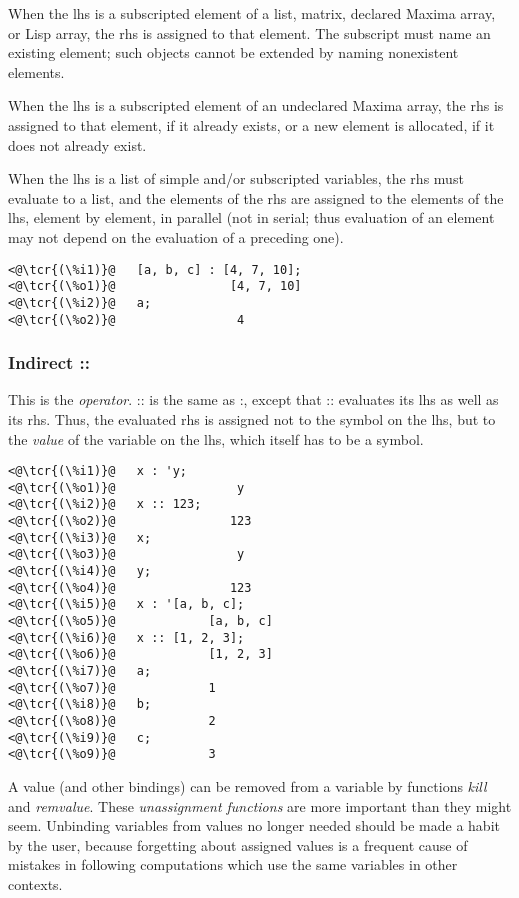 \documentclass[../Maxima_Workbook.tex]{subfiles}
\begin{document}
\lz When the lhs is a subscripted element of a list, matrix, declared Maxima array, or Lisp array, the rhs is assigned to that element. The subscript must name an existing element; such objects cannot be extended by naming nonexistent elements.

\lz When the lhs is a subscripted element of an undeclared Maxima array, the rhs is assigned to that element, if it already exists, or a new element is allocated, if it does not already exist.

\lz When the lhs is a list of simple and/or subscripted variables, the rhs must evaluate to a list, and the elements of the rhs are assigned to the elements of the lhs, element by element, in parallel (not in serial; thus evaluation of an element may not depend on the evaluation of a preceding one).

\lz \begin{lstlisting}
<@\tcr{(\%i1)}@   [a, b, c] : [4, 7, 10];
<@\tcr{(\%o1)}@			       [4, 7, 10]
<@\tcr{(\%i2)}@   a;
<@\tcr{(\%o2)}@			        4
\end{lstlisting}

\subsubsection{Indirect ::}

\lz \hyt{::}{\tcr{\emph{::}}} \hfill {}\index{::}

\lz This is the  \emph{operator}. :: is the same as :, except that :: evaluates its lhs as well as its rhs. Thus, the evaluated rhs is assigned not to the symbol on the lhs, but to the \emph{value} of the variable on the lhs, which itself has to be a symbol.

\lz \begin{lstlisting}
<@\tcr{(\%i1)}@   x : 'y;
<@\tcr{(\%o1)}@			        y
<@\tcr{(\%i2)}@   x :: 123;
<@\tcr{(\%o2)}@			       123
<@\tcr{(\%i3)}@   x;
<@\tcr{(\%o3)}@			        y
<@\tcr{(\%i4)}@   y;
<@\tcr{(\%o4)}@			       123
<@\tcr{(\%i5)}@   x : '[a, b, c];
<@\tcr{(\%o5)}@			    [a, b, c]
<@\tcr{(\%i6)}@   x :: [1, 2, 3];
<@\tcr{(\%o6)}@			    [1, 2, 3]
<@\tcr{(\%i7)}@   a;
<@\tcr{(\%o7)}@				1
<@\tcr{(\%i8)}@   b;
<@\tcr{(\%o8)}@				2
<@\tcr{(\%i9)}@   c;
<@\tcr{(\%o9)}@				3
\end{lstlisting}

\lz A value (and other bindings) can be removed from a variable by functions \emph{kill} and \emph{remvalue}. These \emph{unassignment functions} are more important than they might seem. Unbinding variables from values no longer needed should be made a habit by the user, because forgetting about assigned values is a frequent cause of mistakes in following computations which use the same variables in other contexts.
\end{document}
